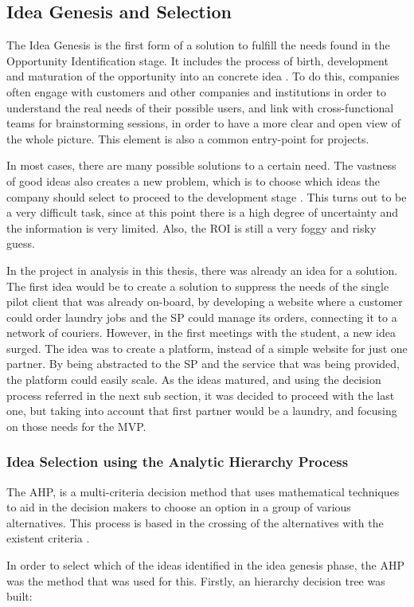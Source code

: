 \subsection{Idea Genesis and Selection}
The Idea Genesis is the first form of a solution to fulfill the needs found in the Opportunity Identification stage. It includes the process of birth, development and maturation of the opportunity into an concrete idea \parencite{commonLanguageForFFE}. To do this, companies often engage with customers and other companies and institutions in order to understand the real needs of their possible users, and link with cross-functional teams for brainstorming sessions, in order to have a more clear and open view of the whole picture. This element is also a common entry-point for projects. 
\par
In most cases, there are many possible solutions to a certain need. The vastness of good ideas also creates a new problem, which is to choose which ideas the company should select to proceed to the development stage \parencite{commonLanguageForFFE}. This turns out to be a very difficult task, since at this point there is a high degree of uncertainty and the information is very limited. Also, the \gls{ROI} is still a very foggy and risky guess.
\par
In the project in analysis in this thesis, there was already an idea for a solution. The first idea would be to create a solution to suppress the needs of the single pilot client that was already on-board, by developing a website where a customer could order laundry jobs and the \gls{SP} could manage its orders, connecting it to a network of couriers. However, in the first meetings with the student, a new idea surged. The idea was to create a platform, instead of a simple website for just one partner. By being abstracted to the \gls{SP} and the service that was being provided, the platform could easily scale. As the ideas matured, and using the decision process referred in the next sub section, it was decided to proceed with the last one, but taking into account that first partner would be a laundry, and focusing on those needs for the \gls{MVP}.

\subsubsection{Idea Selection using the Analytic Hierarchy Process}
The \gls{AHP}, is a multi-criteria decision method that uses mathematical techniques to aid in the decision makers to choose an option in a group of various alternatives. This process is based in the crossing of the alternatives with the existent criteria \parencite{whatIsAHP}.
\par
In order to select which of the ideas identified in the idea genesis phase, the \gls{AHP} was the method that was used for this. Firstly, an hierarchy decision tree was built:

